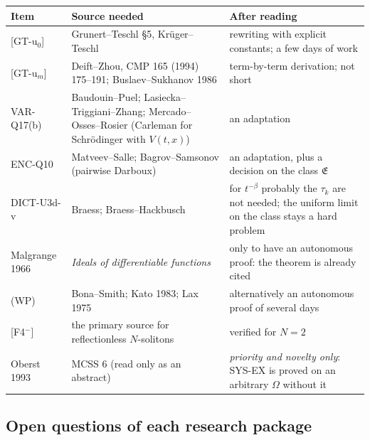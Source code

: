 \documentclass[11pt]{article}
\theoremstyle{plain}
\theoremstyle{definition}
\theoremstyle{remark}
\begin{document}
\begin{center}\small
\begin{longtable}{@{}L{2.4cm}L{5.4cm}L{7.0cm}@{}}
\toprule
Item & Source needed & After reading\\\midrule\endhead
{[GT-u$_0$]} & Grunert--Teschl \S5, Kr\"uger--Teschl & rewriting with explicit constants; a few days of work\\
{[GT-u$_m$]} & Deift--Zhou, CMP 165 (1994) 175--191; Buslaev--Sukhanov 1986 & term-by-term derivation; not short\\
VAR-Q17(b) & Baudouin--Puel; Lasiecka--Triggiani--Zhang; Mercado--Osses--Rosier (Carleman for Schr\"odinger with $V(t,x)$) & an adaptation\\
ENC-Q10 & Matveev--Salle; Bagrov--Samsonov (pairwise Darboux) & an adaptation, plus a decision on the class $\mathfrak E$\\
DICT-U3d-v & Braess; Braess--Hackbusch & for $t^{-\beta}$ probably the $\tau_k$ are not needed; the uniform limit on the class stays a hard problem\\
Malgrange 1966 & \emph{Ideals of differentiable functions} & only to have an autonomous proof: the theorem is already cited\\
(WP) & Bona--Smith; Kato 1983; Lax 1975 & alternatively an autonomous proof of several days\\
{[F4$^-$]} & the primary source for reflectionless $N$-solitons & verified for $N=2$\\
Oberst 1993 & MCSS 6 (read only as an abstract) & \emph{priority and novelty only}: SYS-EX is proved on an arbitrary $\Omega$ without it\\
\bottomrule
\end{longtable}
\end{center}

\subsection{Open questions of each research package}
\end{document}
